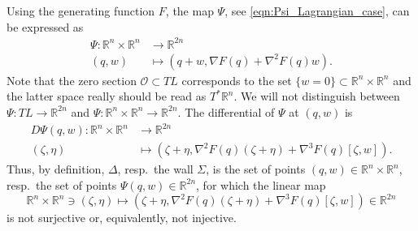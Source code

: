 \documentclass[12pt]{article}
\newcommand{\R}{{\mathbb R}}
\begin{document}
%
%
Using the generating function $F$, the map $\Psi$, see \eqref{eqn:Psi_Lagrangian_case}, can be expressed as
\begin{equation}\nonumber
\begin{aligned}
\Psi:\R^n\times\R^n&\to \R^{2n}\\
(q,w)&\mapsto (q+w,\nabla F(q)+\nabla^2F(q)w).
\end{aligned}
\end{equation}
Note that the zero section $\mathcal{O}\subset TL$ corresponds to the set $\{w=0\}\subset\R^n\times\R^n$ and the latter space really should be read as $T^*\R^n$. We will not distinguish between $\Psi:TL\to\R^{2n}$ and $\Psi:\R^n\times\R^n\to\R^{2n}$. The differential of $\Psi$ at $(q,w)$ is
\begin{equation}\label{eqn:derivative_Psi}
\begin{aligned}
D\Psi(q,w):\R^n\times\R^n&\to \R^{2n}\\[1ex]
(\zeta,\eta)&\mapsto %
(\zeta+\eta,\nabla^2 F(q)(\zeta+\eta)+\nabla^3F(q)[\zeta,w]).
\end{aligned}
\end{equation}
Thus, by definition, $\Delta$, resp.~the wall $\Sigma$, is the set of points $(q,w)\in\R^n\times\R^n$, resp.~the set of points $\Psi(q,w)\in\R^{2n}$, for which the linear map
\begin{equation}\nonumber
\R^n\times\R^n\ni(\zeta,\eta) \mapsto (\zeta+\eta,\nabla^2 F(q)(\zeta+\eta)+\nabla^3F(q)[\zeta,w])\in \R^{2n}
\end{equation}
is not surjective or, equivalently, not injective. 
\end{document}
